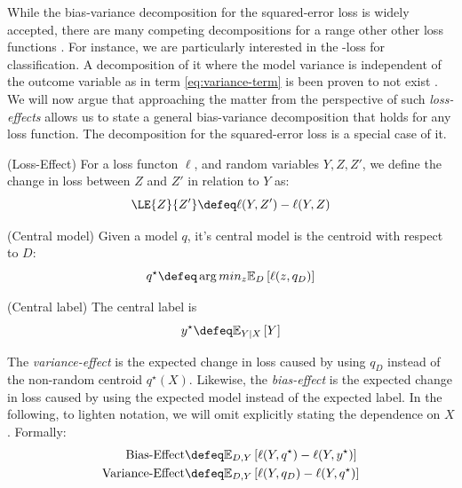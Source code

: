 \documentclass[
    a4paper, %
	fontsize=10pt, %
	twoside=false, %
]{kaobook}
\begin{document}
While the bias-variance decomposition for the squared-error loss is widely accepted, there are many competing decompositions for a range other other loss functions \cite{todo}. For instance, we are particularly interested in the \zeroone-loss for classification. A decomposition of it where the model variance is independent of the outcome variable as in term \ref{eq:variance-term} is been proven to not exist \cite{todo}. We will now argue that approaching the matter from the perspective of such \textit{loss-effects} allows us to state a general bias-variance decomposition that holds for any loss function. The decomposition for the squared-error loss is a special case of it.

\begin{definition} (Loss-Effect) For a loss functon $\ell$, and random variables $Y, Z, Z'$, we define the change in loss between $Z$ and $Z'$ in relation to $Y$ as:
  $$
  \LE{Z}{Z'} \defeq \ell(Y, Z') - \ell(Y, Z)
  $$
  \label{def:loss-effect}
\end{definition}

\begin{definition}
\label{def:central-model}
(Central model) Given a model $q$, it's central model is the centroid with respect to $D$:
$$
q^\star \defeq \arg\\min_{z} \mathbb{E}_{D}\left[ \ell(z, q_{D}) \right] 
$$
\end{definition}

\begin{definition}
\label{def:central-label}
(Central label) The central label is 
$$
y^\star \defeq \mathbb{E}_{Y|X}\left[ Y \right] 
$$
\end{definition}

The \textit{variance-effect} is the expected change in loss caused by using $q_{D}$ instead of the non-random centroid $q^\star(X)$. Likewise, the \textit{bias-effect} is the expected change in loss caused by using the expected model instead of the expected label. In the following, to lighten notation, we will omit explicitly stating the dependence on $X$.
Formally:
\begin{align*}
\text{Bias-Effect} &\defeq \mathbb{E}_{D,Y}\left[ \ell(Y, q^\star) - \ell(Y, y^\star) \right] \\
\text{Variance-Effect} &\defeq \mathbb{E}_{D,Y}\left[ \ell(Y, q_{D}) - \ell(Y, q^\star) \right] 
\end{align*}
\end{document}
